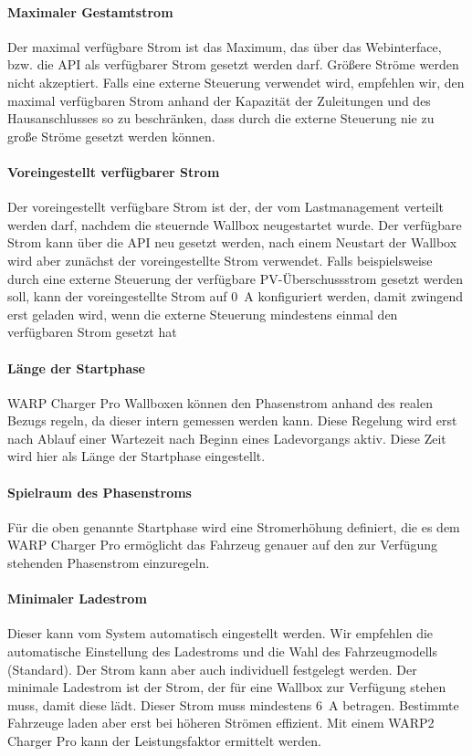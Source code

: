 \documentclass[a4paper,10pt]{article}
\begin{document}
\begin{multicols*}{2}
	\paragraph{Maximaler Gestamtstrom}
	Der maximal verfügbare Strom ist das Maximum, das über das Webinterface, bzw. die API als verfügbarer Strom gesetzt werden darf.
	Größere Ströme werden nicht akzeptiert. Falls eine externe Steuerung verwendet wird, empfehlen wir, den maximal verfügbaren Strom
	anhand der Kapazität der Zuleitungen und des Hausanschlusses so zu beschränken, dass durch die externe Steuerung nie zu große
	Ströme gesetzt werden können.

	\paragraph{Voreingestellt verfügbarer Strom}
	Der voreingestellt verfügbare Strom ist der, der vom Lastmanagement verteilt werden darf, nachdem die steuernde Wallbox
	neugestartet wurde. Der verfügbare Strom kann über die API neu gesetzt werden, nach einem Neustart der Wallbox wird aber
	zunächst der voreingestellte Strom verwendet. Falls beispielsweise durch eine externe Steuerung der verfügbare PV-Überschussstrom
	gesetzt werden soll, kann der voreingestellte Strom auf \SI{0}{\ampere} konfiguriert werden, damit zwingend erst geladen wird,
	wenn die externe Steuerung mindestens einmal den verfügbaren Strom gesetzt hat
	\paragraph{Länge der Startphase}
	WARP Charger Pro Wallboxen können den Phasenstrom anhand des realen Bezugs regeln, da dieser
	intern gemessen werden kann. Diese Regelung wird erst nach Ablauf einer
	Wartezeit nach Beginn eines Ladevorgangs aktiv. Diese Zeit wird hier als
	Länge der Startphase eingestellt.

	\paragraph{Spielraum des Phasenstroms}
	Für die oben genannte Startphase wird eine Stromerhöhung definiert, die es
	dem WARP Charger Pro ermöglicht das Fahrzeug genauer auf den zur Verfügung
	stehenden Phasenstrom einzuregeln.

	\paragraph{Minimaler Ladestrom}
	Dieser kann vom System automatisch eingestellt werden. Wir empfehlen die automatische Einstellung des Ladestroms und die Wahl des Fahrzeugmodells (\glqq Standard\grqq).
	Der Strom kann aber auch individuell festgelegt werden.
	Der minimale Ladestrom ist der Strom, der für eine Wallbox zur Verfügung stehen muss, damit diese lädt. Dieser Strom muss mindestens \SI{6}{\ampere} betragen.
	Bestimmte Fahrzeuge laden aber erst bei höheren Strömen effizient. Mit einem WARP2 Charger Pro kann der Leistungsfaktor ermittelt werden.


\end{multicols*}
\end{document}
